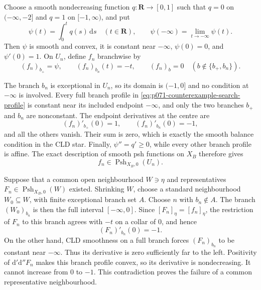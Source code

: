 
Choose a smooth nondecreasing function
\(q:\mathbf R\to[0,1]\) such that \(q=0\) on
\((-\infty,-2]\) and \(q=1\) on \([-1,\infty)\), and put
\[
                         \psi(t)=\int_0^t q(s)\,\mathrm ds
                         \quad(t\in\mathbf R),
 \qquad
                         \psi(-\infty)=
                         \lim_{t\to-\infty}\psi(t).
\]
Then \(\psi\) is smooth and convex, it is constant near \(-\infty\),
\(\psi(0)=0\), and \(\psi'(0)=1\). On \(U_n\), define \(f_n\) branchwise
by
\begin{equation}
 (f_n)_{b_+}=\psi,
 \qquad
 (f_n)_{b_n}(t)=-t,
 \qquad
 (f_n)_b=0\quad(b\notin\{b_+,b_n\}).
 \label{eq:p071-counterexample-search-profile}
\end{equation}

The branch \(b_n\) is exceptional in \(U_n\), so its domain is
\((-1,0]\) and no condition at \(-\infty\) is involved. Every full branch
profile in \eqref{eq:p071-counterexample-search-profile} is constant near
its included endpoint \(-\infty\), and only the two branches \(b_+\) and
\(b_n\) are nonconstant. The endpoint derivatives at the centre are
\[
                   (f_n)'_{b_+}(0)=1,
                   \qquad (f_n)'_{b_n}(0)=-1,
\]
and all the others vanish. Their sum is zero, which is exactly the smooth
balance condition in the CLD star. Finally,
\(\psi''=q'\geq0\), while every other branch profile is affine. The exact
description of smooth psh functions on \(X_B\) therefore gives
\[
                  f_n\in\operatorname{Psh}_{X_B,0}(U_n).
\]

Suppose that a common open neighbourhood \(W\ni\eta\) and representatives
\(F_n\in\operatorname{Psh}_{X_B,0}(W)\) existed. Shrinking \(W\), choose
a standard neighbourhood \(W_0\subseteq W\), with finite exceptional
branch set \(A\). Choose \(n\) with \(b_n\notin A\). The branch
\((W_0)_{b_n}\) is then the full interval \([-\infty,0]\). Since
\([F_n]_\eta=[f_n]_\eta\), the restriction of \(F_n\) to this branch
agrees with \(-t\) on a collar of \(0\), and hence
\[
                              (F_n)'_{b_n}(0)=-1.
\]
On the other hand, CLD smoothness on a full branch forces
\((F_n)_{b_n}\) to be constant near \(-\infty\). Thus its derivative is
zero sufficiently far to the left. Positivity of
\(\mathrm d'\mathrm d''F_n\) makes this branch profile convex, so its
derivative is nondecreasing. It cannot increase from \(0\) to \(-1\).
This contradiction proves the failure of a common representative
neighbourhood.

